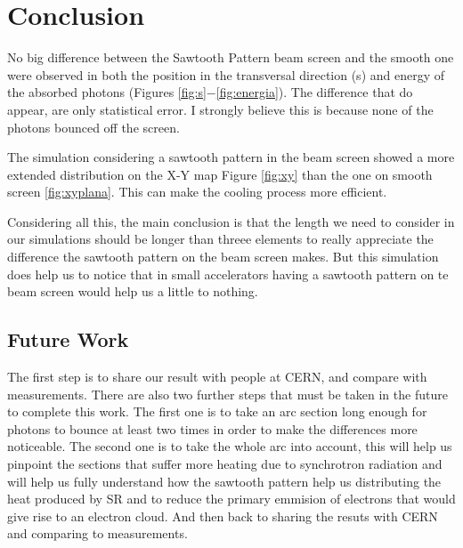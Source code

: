 
\chapter*{Conclusion} %
\label{conclusion} %


No big difference between the Sawtooth Pattern beam screen and the smooth one were observed in both the position in the transversal direction (s) and energy of the absorbed photons (Figures \ref{fig:s}$-$\ref{fig:energia}). The difference that do appear, are only statistical error. I strongly believe this is because none of the photons bounced off the screen.

The simulation considering a sawtooth pattern in the beam screen showed a more extended distribution on the X-Y map Figure \ref{fig:xy} than the one on smooth screen \ref{fig:xyplana}. This can make the cooling process more efficient.

Considering all this, the main conclusion is that the length we need to consider in our simulations should be longer than threee elements to really appreciate the difference the sawtooth pattern on the beam screen makes. But this simulation does help us to notice that in small accelerators having a sawtooth pattern on te beam screen would help us a little to nothing.
\section*{Future Work} %
\label{FW}
The first step is to share our result with people at CERN, and compare with measurements. 
There are also two further steps that must be taken in the future to complete this work.
The first one is to take an arc section long enough for photons to bounce at least two times in order to make the differences more noticeable. 
The second one is to take the whole arc into account, this will help us pinpoint the sections that suffer more heating due to synchrotron radiation and will help us fully understand how the sawtooth pattern help us distributing the heat produced by SR and to reduce the primary emmision of electrons that would give rise to an electron cloud. And then back to sharing the resuts with CERN and comparing to measurements.